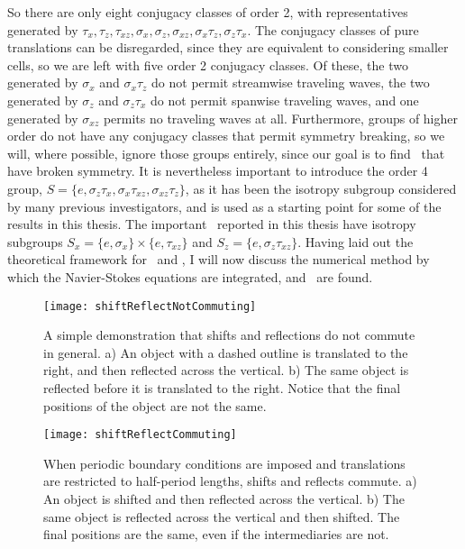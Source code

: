 So there are only eight conjugacy classes of order 2, with representatives generated by $\tau_x,\tau_z,\tau_{xz}, \sigma_x,\sigma_z,\sigma_{xz},\sigma_{x}\tau_z,\sigma_z\tau_x$. The conjugacy classes of pure translations can be disregarded, since they are equivalent to considering smaller cells, so we are left with five order 2 conjugacy classes. Of these, the two  generated by $\sigma_x$ and $\sigma_x\tau_z$ do not permit streamwise traveling waves, the two generated by $\sigma_z$ and $\sigma_z\tau_x$ do not permit spanwise traveling waves, and one generated by  $\sigma_{xz}$ permits no traveling waves at all. Furthermore, groups of higher order do not have any conjugacy classes that permit symmetry breaking, so we will, where possible, ignore those groups entirely, since our goal is to find \ecs\ that have broken symmetry. It is nevertheless important to introduce the order 4 group, $S = \{ e, \sigma_z\tau_x,\sigma_x\tau_{xz},\sigma_{xz}\tau_z\}$, as it has been the isotropy subgroup considered by many previous investigators, and is used as a starting point for some of the results in this thesis. The important \ecs\ reported in this thesis have isotropy subgroups $S_x = \{ e, \sigma_x\} \times \{e,\tau_{xz}\}$ and $S_z = \{e, \sigma_z\tau_{xz}\}$. Having laid out the theoretical framework for \pCf\ and \ecs, I will now discuss the numerical method by which the Navier-Stokes equations are integrated, and \ecs\ are found.  
\begin{figure}[t!]
\texttt{[image: shiftReflectNotCommuting]}
\caption{A simple demonstration that shifts and reflections do not commute in general. a) An object with a dashed outline is translated to the right, and then reflected across the vertical. b) The same object is reflected before it is translated to the right. Notice that the final positions of the object are not the same.}\label{fig:notabelian}
\end{figure}

\begin{figure}[t!]
\texttt{[image: shiftReflectCommuting]}
\caption{When periodic boundary conditions are imposed and translations are restricted to half-period lengths, shifts and reflects commute. a) An object is shifted and then reflected across the vertical. b) The same object is reflected across the vertical and then shifted. The final positions are the same, even if the intermediaries are not.}\label{fig:abelian}
\end{figure}
  
